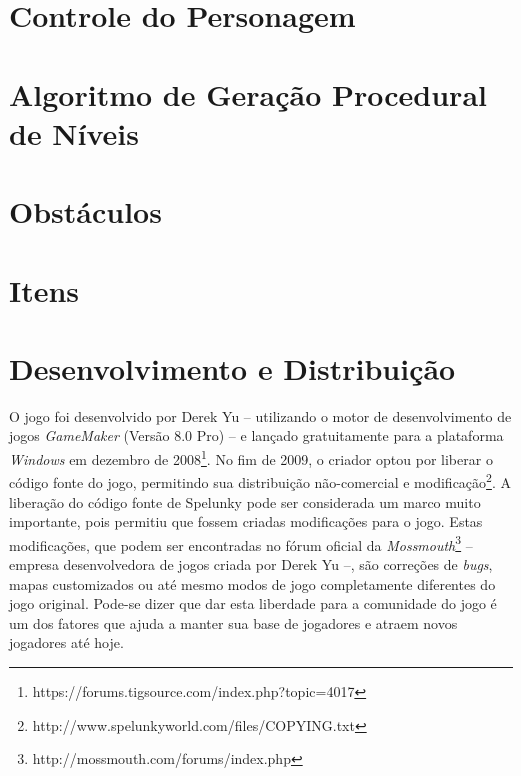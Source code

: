 \section{\label{section:spelunky-controls}Controle do Personagem}


\section{\label{section:spelunky-procgen}Algoritmo de Geração Procedural de
Níveis}


\section{\label{section:spelunky-obstacles}Obstáculos}


\section{\label{section:spelunky-items}Itens}


\section{\label{section:spelunky-dev}Desenvolvimento e Distribuição}
O jogo foi desenvolvido por Derek Yu -- utilizando o motor de desenvolvimento de
jogos \textit{GameMaker} (Versão 8.0 Pro) -- e lançado gratuitamente para a
plataforma \textit{Windows} em dezembro de
2008\footnote{https://forums.tigsource.com/index.php?topic=4017}. No fim de
2009, o criador optou por liberar o código fonte do jogo, permitindo sua
distribuição não-comercial e
modificação\footnote{http://www.spelunkyworld.com/files/COPYING.txt}. A
liberação do código fonte de Spelunky pode ser considerada um marco muito
importante, pois permitiu que fossem criadas modificações para o jogo. Estas
modificações, que podem ser encontradas no fórum oficial da
\textit{Mossmouth}\footnote{http://mossmouth.com/forums/index.php} -- empresa
desenvolvedora de jogos criada por Derek Yu --, são correções de \textit{bugs},
mapas customizados ou até mesmo modos de jogo completamente diferentes do jogo
original. Pode-se dizer que dar esta liberdade para a comunidade do jogo é um
dos fatores que ajuda a manter sua base de jogadores e atraem novos jogadores
até hoje.

